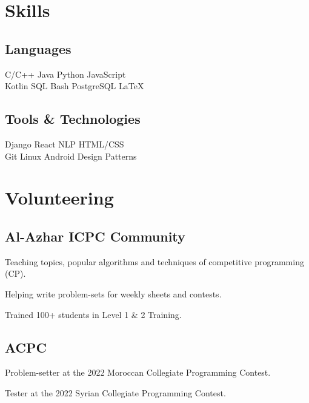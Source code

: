 \documentclass[]{deedy-resume-openfont}
\begin{document}
\begin{minipage}[t]{0.33\textwidth}

\section{Skills}
\subsection{Languages}
C/C++ \textbullet{} Java \textbullet{} Python \textbullet{} JavaScript \\
Kotlin \textbullet{} SQL \textbullet{} Bash \textbullet{} PostgreSQL \textbullet{} \LaTeX\ \\
\hspace{}
\subsection{Tools \& Technologies}
Django \textbullet{} React \textbullet{} NLP \textbullet{} HTML/CSS \\
Git \textbullet{} Linux \textbullet{} Android \textbullet{} Design Patterns \\
\sectionsep


\section{Volunteering}
\subsection{Al-Azhar ICPC Community}
\vspace{\topsep} %
\begin{tightemize}
    \item Teaching topics, popular algorithms and techniques of competitive programming (CP).\\
    \item Helping write problem-sets for weekly sheets and contests.
    \item Trained 100+ students in Level 1 \& 2 Training.
\end{tightemize}
\sectionsep

\subsection{ACPC}
\begin{tightemize}
    \item Problem-setter at the 2022 Moroccan Collegiate Programming Contest.\\
    \item Tester at the 2022 Syrian Collegiate Programming Contest.\\
\end{tightemize}
\sectionsep



\end{minipage}
\end{document}
